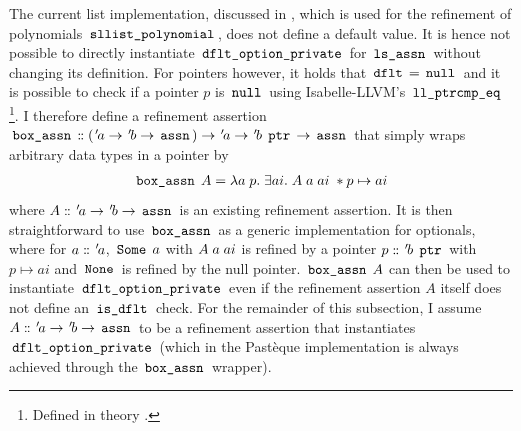 The current list implementation, discussed in , which is used for the refinement of polynomials $\,\text{\ttfamily sllist\_polynomial}\,$, does not define a default value.
It is hence not possible to directly instantiate $\,\text{\ttfamily dflt\_option\_private}\,$ for $\,\text{\ttfamily ls\_assn}\,$ without changing its definition.
For pointers however, it holds that $\,\text{\ttfamily dflt}\, = \,\text{\ttfamily null}\,$ and it is possible to check if a pointer $p$ is $\,\text{\ttfamily null}\,$ using Isabelle-LLVM's $\,\text{\ttfamily ll\_ptrcmp\_eq}\,$\footnote{Defined in theory .}.
I therefore define a refinement assertion $\,\text{\ttfamily box\_assn}\, \mathrel{\mathord{:}\mkern-1.2mu\mathord{:}} ({\mskip2mu '\mskip-2mua} \rightarrow {\mskip2mu '\mskip-2mub} \rightarrow \,\text{\ttfamily assn}\,) \rightarrow {\mskip2mu '\mskip-2mua} \rightarrow {\mskip2mu '\mskip-2mub} \; \,\text{\ttfamily ptr}\, \rightarrow \,\text{\ttfamily assn}\,$ that simply wraps arbitrary data types in a pointer by
\begin{gather*}
	\,\text{\ttfamily box\_assn}\, \; A = \lambda a \; p. \; \exists ai. \; A \; a \; ai \; \ast p\mapsto ai
\end{gather*}
where $A \mathrel{\mathord{:}\mkern-1.2mu\mathord{:}} {\mskip2mu '\mskip-2mua} \rightarrow {\mskip2mu '\mskip-2mub} \rightarrow \,\text{\ttfamily assn}\,$ is an existing refinement assertion.
It is then straightforward to use $\,\text{\ttfamily box\_assn}\,$ as a generic implementation for optionals, where for $a \mathrel{\mathord{:}\mkern-1.2mu\mathord{:}} {\mskip2mu '\mskip-2mua}$, $\,\text{\ttfamily Some}\, \; a$ with $A \; a \; ai$ is refined by a pointer $p \mathrel{\mathord{:}\mkern-1.2mu\mathord{:}} {\mskip2mu '\mskip-2mub} \; \,\text{\ttfamily ptr}\,$ with $p \mapsto ai$ and $\,\text{\ttfamily None}\,$ is refined by the null pointer.
$\,\text{\ttfamily box\_assn}\, \; A$ can then be used to instantiate $\,\text{\ttfamily dflt\_option\_private}\,$ even if the refinement assertion $A$ itself does not define an $\,\text{\ttfamily is\_dflt}\,$ check.
For the remainder of this subsection, I assume $A \mathrel{\mathord{:}\mkern-1.2mu\mathord{:}} {\mskip2mu '\mskip-2mua} \rightarrow {\mskip2mu '\mskip-2mub} \rightarrow \,\text{\ttfamily assn}\,$ to be a refinement assertion that instantiates $\,\text{\ttfamily dflt\_option\_private}\,$ (which in the Pastèque implementation is always achieved through the $\,\text{\ttfamily box\_assn}\,$ wrapper).

